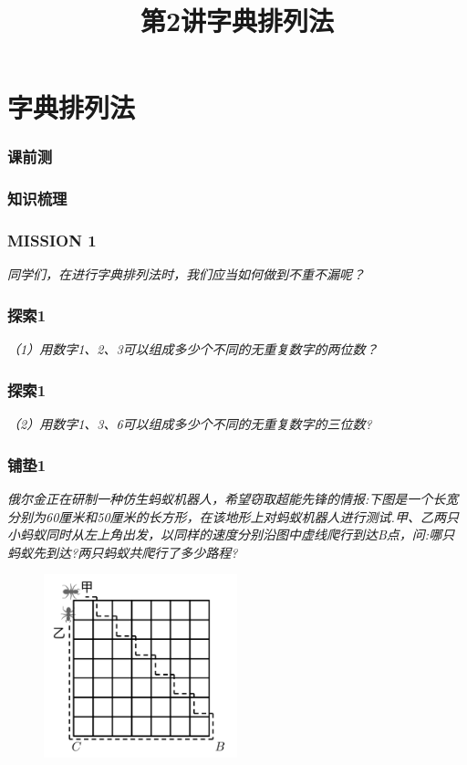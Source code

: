 \section{字典排列法}

\title[第2讲\quad 字典排列法]{第2讲\quad 字典排列法} 
\author{}
\date{}
\begin{frame}
    \titlepage
\end{frame}

\begin{frame}
    \frametitle{课前测}
    \begin{figure}[H] %
        \centering %
    \end{figure}
\end{frame}

\begin{frame}
    \frametitle{知识梳理}
\end{frame}

\begin{frame}
    \frametitle{MISSION 1}
    \textit{同学们，在进行字典排列法时，我们应当如何做到不重不漏呢？}
\end{frame}

\begin{frame}
    \frametitle{探索1}
    \textit{（1）用数字1、2、3可以组成多少个不同的无重复数字的两位数？}
\end{frame}

\begin{frame}
    \frametitle{探索1}
    \textit{（2）用数字1、3、6可以组成多少个不同的无重复数字的三位数?}
\end{frame}

\begin{frame}
    \frametitle{铺垫1}
    \textit{俄尔金正在研制一种仿生蚂蚁机器人，希望窃取超能先锋的情报:下图是一个长宽分别为60厘米和50厘米的长方形，在该地形上对蚂蚁机器人进行测试.甲、乙两只小蚂蚁同时从左上角出发，以同样的速度分别沿图中虚线爬行到达B点，问:哪只蚂蚁先到达?两只蚂蚁共爬行了多少路程?}
    \begin{figure}[H] 
        \centering
        \includegraphics[width=0.5\textwidth]{./pics/Chapter_1/pudian1.png}
    \end{figure}
\end{frame}


